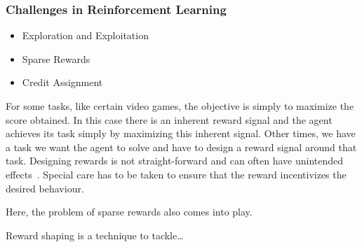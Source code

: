 

\subsubsection{Challenges in Reinforcement Learning}


\begin{itemize}
    \item Exploration and Exploitation
    \item Sparse Rewards
    \item Credit Assignment~\cite{minsky_cap_1961}
\end{itemize}

For some tasks, like certain video games, the objective is simply to maximize the score obtained.
In this case there is an inherent reward signal and the agent achieves its task simply by maximizing this inherent signal.
Other times, we have a task we want the agent to solve and have to design a reward signal around that task.
Designing rewards is not straight-forward and can often have unintended effects~\cite{sutton_reinforcement_2018}.
Special care has to be taken to ensure that the reward incentivizes the desired behaviour.

Here, the problem of sparse rewards also comes into play.

Reward shaping is a technique to tackle\dots~\cite{mataric_shaping_1994}



